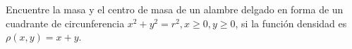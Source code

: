 \item Encuentre la masa y el centro de masa de un alambre delgado en forma de un cuadrante de circunferencia $x^2 + y^2 = r^2, x \ge 0, y \ge 0$, si la función densidad es $\rho(x, y) = x + y$.
